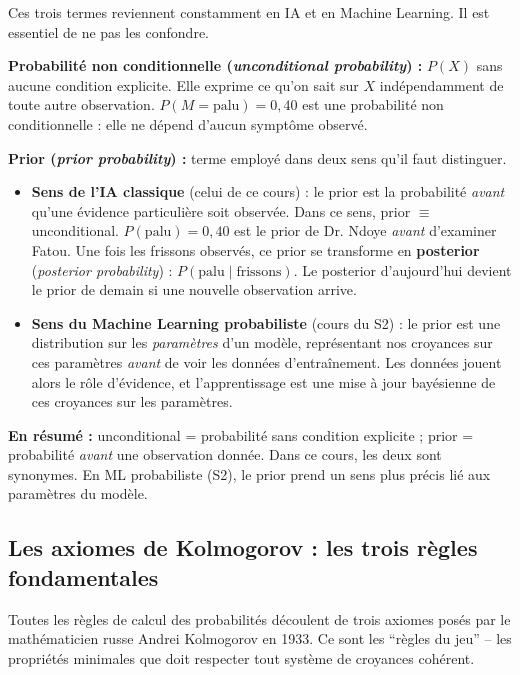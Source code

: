 \documentclass[11pt,a4paper]{article}
\begin{document}
\begin{attentionbox}
Ces trois termes reviennent constamment en IA et en Machine Learning. Il est essentiel de ne pas les confondre.

\textbf{Probabilité non conditionnelle (\textit{unconditional probability}) :} $P(X)$ sans aucune condition explicite. Elle exprime ce qu'on sait sur $X$ indépendamment de toute autre observation. $P(M = \text{palu}) = 0{,}40$ est une probabilité non conditionnelle : elle ne dépend d'aucun symptôme observé.

\textbf{Prior (\textit{prior probability}) :} terme employé dans deux sens qu'il faut distinguer.

\begin{itemize}
    \item \textbf{Sens de l'IA classique} (celui de ce cours) : le prior est la probabilité \textit{avant} qu'une évidence particulière soit observée. Dans ce sens, prior $\equiv$ unconditional. $P(\text{palu}) = 0{,}40$ est le prior de Dr. Ndoye \textit{avant} d'examiner Fatou. Une fois les frissons observés, ce prior se transforme en \textbf{posterior} (\textit{posterior probability}) : $P(\text{palu} \mid \text{frissons})$. Le posterior d'aujourd'hui devient le prior de demain si une nouvelle observation arrive.

    \item \textbf{Sens du Machine Learning probabiliste} (cours du S2) : le prior est une distribution sur les \textit{paramètres} d'un modèle, représentant nos croyances sur ces paramètres \textit{avant} de voir les données d'entraînement. Les données jouent alors le rôle d'évidence, et l'apprentissage est une mise à jour bayésienne de ces croyances sur les paramètres.
\end{itemize}

\textbf{En résumé :} unconditional = probabilité sans condition explicite ; prior = probabilité \textit{avant} une observation donnée. Dans ce cours, les deux sont synonymes. En ML probabiliste (S2), le prior prend un sens plus précis lié aux paramètres du modèle.
\end{attentionbox}

\subsection{Les axiomes de Kolmogorov : les trois règles fondamentales}

Toutes les règles de calcul des probabilités découlent de trois axiomes posés par le mathématicien russe Andrei Kolmogorov en 1933. Ce sont les ``règles du jeu'' -- les propriétés minimales que doit respecter tout système de croyances cohérent.
\end{document}
